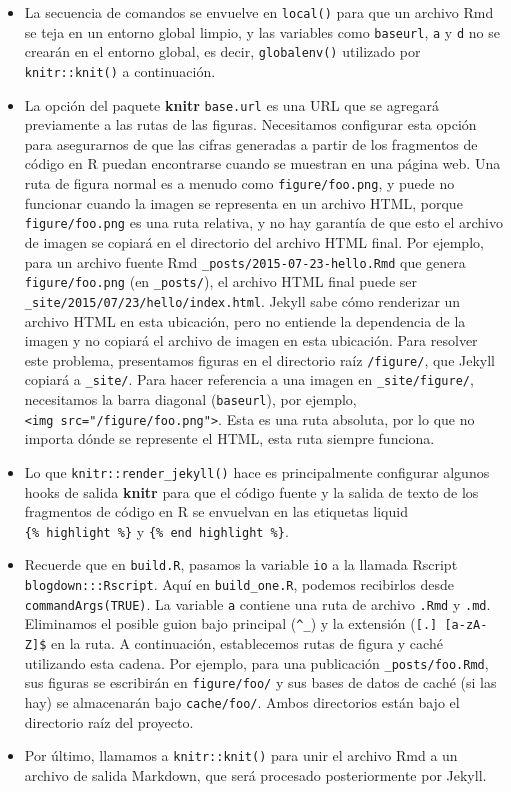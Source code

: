 \documentclass[12pt,]{krantz}
\theoremstyle{definition}
\theoremstyle{definition}
\theoremstyle{definition}
\theoremstyle{remark}
\begin{document}
\begin{itemize}
\item
  La secuencia de comandos se envuelve en \texttt{local()} para que un
  archivo Rmd se teja en un entorno global limpio, y las variables como
  \texttt{baseurl}, \texttt{a} y \texttt{d} no se crearán en el entorno
  global, es decir, \texttt{globalenv()} utilizado por
  \texttt{knitr::knit()} a continuación.
\item
  La opción del paquete \textbf{knitr} \texttt{base.url} es una URL que
  se agregará previamente a las rutas de las figuras. Necesitamos
  configurar esta opción para asegurarnos de que las cifras generadas a
  partir de los fragmentos de código en R puedan encontrarse cuando se
  muestran en una página web. Una ruta de figura normal es a menudo como
  \texttt{figure/foo.png}, y puede no funcionar cuando la imagen se
  representa en un archivo HTML, porque \texttt{figure/foo.png} es una
  ruta relativa, y no hay garantía de que esto el archivo de imagen se
  copiará en el directorio del archivo HTML final. Por ejemplo, para un
  archivo fuente Rmd \texttt{\_posts/2015-07-23-hello.Rmd} que genera
  \texttt{figure/foo.png} (en \texttt{\_posts/}), el archivo HTML final
  puede ser \texttt{\_site/2015/07/23/hello/index.html}. Jekyll sabe
  cómo renderizar un archivo HTML en esta ubicación, pero no entiende la
  dependencia de la imagen y no copiará el archivo de imagen en esta
  ubicación. Para resolver este problema, presentamos figuras en el
  directorio raíz \texttt{/figure/}, que Jekyll copiará a
  \texttt{\_site/}. Para hacer referencia a una imagen en
  \texttt{\_site/figure/}, necesitamos la barra diagonal
  (\texttt{baseurl}), por ejemplo,
  \texttt{\textless{}img\ src="/figure/foo.png"\textgreater{}}. Esta es
  una ruta absoluta, por lo que no importa dónde se represente el HTML,
  esta ruta siempre funciona.
\item
  Lo que \texttt{knitr::render\_jekyll()}
  hace es principalmente configurar
  algunos hooks de salida \textbf{knitr} para que el código fuente y la
  salida de texto de los fragmentos de código en R se envuelvan en las
  etiquetas liquid \texttt{\{\%\ highlight\ \%\}} y
  \texttt{\{\%\ end\ highlight\ \%\}}.
\item
  Recuerde que en \texttt{build.R}, pasamos la variable \texttt{io} a la
  llamada Rscript \texttt{blogdown:::Rscript}. Aquí en
  \texttt{build\_one.R}, podemos recibirlos desde
  \texttt{commandArgs(TRUE)}. La variable \texttt{a} contiene una ruta
  de archivo \texttt{.Rmd} y \texttt{.md}. Eliminamos el posible guion
  bajo principal (\texttt{\^{}\_}) y la extensión
  (\texttt{{[}.{]}\ {[}a-zA-Z{]}\$} en la ruta. A continuación,
  establecemos rutas de figura y caché utilizando esta cadena. Por
  ejemplo, para una publicación \texttt{\_posts/foo.Rmd}, sus figuras se
  escribirán en \texttt{figure/foo/} y sus bases de datos de caché (si
  las hay) se almacenarán bajo \texttt{cache/foo/}. Ambos directorios
  están bajo el directorio raíz del proyecto.
\item
  Por último, llamamos a \texttt{knitr::knit()} para unir el archivo Rmd
  a un archivo de salida Markdown, que será procesado posteriormente por
  Jekyll.
\end{itemize}
\end{document}
